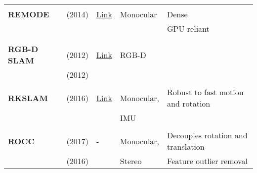 \documentclass[a4paper,12pt]{scrartcl}
\begin{document}
{\begin{longtable}{l|l|l|l|l}
                           &                                   &                                                                    &                       &\\
    \textbf{REMODE}        & \cite{Pizzoli2014} (2014)         & {\href{https://github.com/uzh-rpg/rpg_open_remode}{Link}}          & Monocular             & Dense\\
                           &                                   &                                                                    &                       & GPU reliant\\
                           &                                   &                                                                    &                       &\\
                           &                                   &                                                                    &                       &\\
    \textbf{RGB-D SLAM}    & \cite{Endres2012} (2012)          & {\href{https://github.com/felixendres/rgbdslam_v2}{Link}}          & RGB-D                 &\\
                           & \cite{Endres2012a} (2012)         &                                                                    &                       &\\
                           &                                   &                                                                    &                       &\\
    \textbf{RKSLAM}        & \cite{Liu2016} (2016)             & {\href{https://zjucvg.net/rkslam/rkslam.html}{Link}}               & Monocular,            & Robust to fast motion and rotation\\
                           &                                   &                                                                    & IMU                   &\\
                           &                                   &                                                                    &                       &\\
    \textbf{ROCC}          & \cite{Buczko2017} (2017)          & -                                                                  & Monocular,            & Decouples rotation and translation\\
                           & \cite{Buczko2016} (2016)          &                                                                    & Stereo                & Feature outlier removal\\

\end{longtable}}
\end{document}
